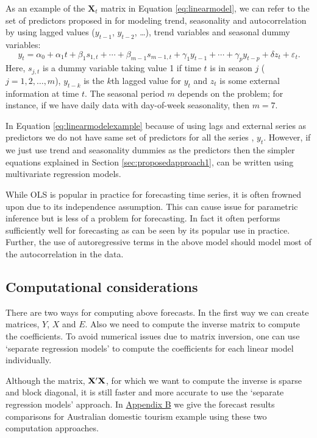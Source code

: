\documentclass[11pt,a4paper,]{article}
\begin{document}
As an example of the \(\bm{X}_t\) matrix in Equation
\eqref{eq:linearmodel}, we can refer to the set of predictors proposed in
\textcite{ashouri2018} for modeling trend, seasonality and
autocorrelation by using lagged values (\(y_{t-1}\), \(y_{t-2}\),
\dots), trend variables and seasonal dummy variables:
\begin{equation}\label{eq:linearmodelexample}
    y_t = \alpha_0 + \alpha_1 t + \beta_1 s_{1,t} + \cdots + \beta_{m-1} s_{m-1,t} + \gamma_1 y_{t-1} + \cdots + \gamma_p y_{t-p} + \delta z_t + \varepsilon_t.
\end{equation} Here, \(s_{j,t}\) is a dummy variable taking value 1 if
time \(t\) is in season \(j\) (\(j=1, 2, \dots, m\)), \(y_{t-k}\) is the
\(k\)th lagged value for \(y_t\) and \(z_t\) is some external
information at time \(t\). The seasonal period \(m\) depends on the
problem; for instance, if we have daily data with day-of-week
seasonality, then \(m=7\).

In Equation \eqref{eq:linearmodelexample} because of using lags and
external series as predictors we do not have same set of predictors for
all the series , \(y_t\). However, if we just use trend and seasonality
dummies as the predictors then the simpler equations explained in
Section \ref{sec:proposedapproach1}, can be written using multivariate
regression models.

While OLS is popular in practice for forecasting time series, it is
often frowned upon due to its independence assumption. This can cause
issue for parametric inference but is less of a problem for forecasting.
In fact it often performs sufficiently well for forecasting as can be
seen by its popular use in practice. Further, the use of autoregressive
terms in the above model should model most of the autocorrelation in the
data.

\hypertarget{computational-considerations}{%
\subsection{Computational
considerations}\label{computational-considerations}}

There are two ways for computing above forecasts. In the first way we
can create matrices, \(Y\), \(X\) and \(E\). Also we need to compute the
inverse matrix to compute the coefficients. To avoid numerical issues
due to matrix inversion, one can use `separate regression models' to
compute the coefficients for each linear model individually.

Although the matrix, \(\bf X'X\), for which we want to compute the
inverse is sparse and block diagonal, it is still faster and more
accurate to use the `separate regression models' approach. In
\protect\hyperlink{appendixB}{Appendix B} we give the forecast results
comparisons for Australian domestic tourism example using these two
computation approaches.
\end{document}
